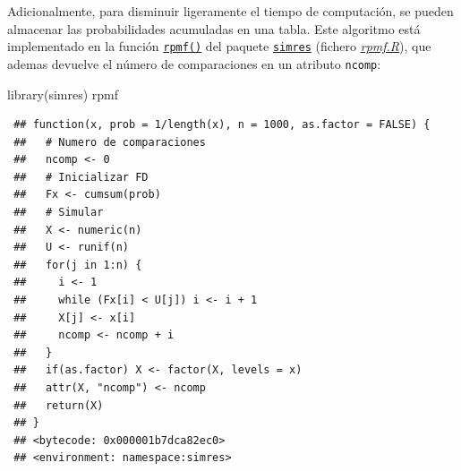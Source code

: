 \documentclass[
]{book}
\newenvironment{Shaded}{\begin{snugshade}}{\end{snugshade}}
\newcommand{\FunctionTok}[1]{\textcolor[rgb]{0.00,0.00,0.00}{#1}}
\newcommand{\NormalTok}[1]{#1}
\theoremstyle{break}
\theoremstyle{nonumberplain}
\begin{document}
Adicionalmente, para disminuir ligeramente el tiempo de computación, se pueden almacenar las probabilidades acumuladas en una tabla.
Este algoritmo está implementado en la función \href{https://rubenfcasal.github.io/simres/reference/rpmf.html}{\texttt{rpmf()}} del paquete \href{https://rubenfcasal.github.io/simres}{\texttt{simres}} (fichero \href{R/rpmf.R}{\emph{rpmf.R}}), que ademas devuelve el número de comparaciones en un atributo \texttt{ncomp}:

\begin{Shaded}
\begin{Highlighting}[]
\FunctionTok{library}\NormalTok{(simres)}
\NormalTok{rpmf}
\end{Highlighting}
\end{Shaded}

\begin{verbatim}
 ## function(x, prob = 1/length(x), n = 1000, as.factor = FALSE) {
 ##   # Numero de comparaciones
 ##   ncomp <- 0
 ##   # Inicializar FD
 ##   Fx <- cumsum(prob)
 ##   # Simular
 ##   X <- numeric(n)
 ##   U <- runif(n)
 ##   for(j in 1:n) {
 ##     i <- 1
 ##     while (Fx[i] < U[j]) i <- i + 1
 ##     X[j] <- x[i]
 ##     ncomp <- ncomp + i
 ##   }
 ##   if(as.factor) X <- factor(X, levels = x)
 ##   attr(X, "ncomp") <- ncomp
 ##   return(X)
 ## }
 ## <bytecode: 0x000001b7dca82ec0>
 ## <environment: namespace:simres>
\end{verbatim}
\end{document}

